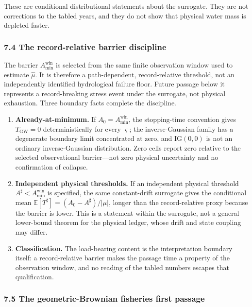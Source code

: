\documentclass[11pt]{article}
\providecommand{\tightlist}{\setlength{\itemsep}{0pt}\setlength{\parskip}{0pt}}
\begin{document}
These are conditional distributional statements about the surrogate.
They are not corrections to the tabled years, and they do not show that
physical water mass is depleted faster.

\subsubsection{7.4 The record-relative barrier
discipline}\label{the-record-relative-barrier-discipline}

The barrier \(A_{\min}^{\mathrm{win}}\) is selected from the same finite observation window used to estimate \(\widehat\mu\). It is therefore a path-dependent, record-relative threshold, not an independently identified hydrological failure floor. Future passage below it represents a record-breaking stress event under the surrogate, not physical exhaustion. Three boundary facts complete the discipline.

\begin{enumerate}
\def\labelenumi{\arabic{enumi}.}
\tightlist
\item
  \textbf{Already-at-minimum.} If \(A_0 = A_{\min}^{\mathrm{win}}\), the
  stopping-time convention gives \(T_{\mathrm{GW}} = 0\)
  deterministically for every \(\varsigma\); the inverse-Gaussian family
  has a degenerate boundary limit concentrated at zero, and
  \(\mathrm{IG}(0,0)\) is not an ordinary inverse-Gaussian distribution.
  Zero cells report zero relative to the selected observational barrier---not zero physical uncertainty and no confirmation of collapse.
\item
  \textbf{Independent physical thresholds.} If an independent physical
  threshold \(A^\sharp < A_{\min}^{\mathrm{win}}\) is specified, the
  same constant-drift surrogate gives the conditional mean
  \(\mathbb{E}[T^\sharp] = (A_0 - A^\sharp)/|\mu|\), longer than the
  record-relative proxy because the barrier is lower. This is a
  statement within the surrogate, not a general lower-bound theorem for
  the physical ledger, whose drift and state coupling may differ.
\item
  \textbf{Classification.} The load-bearing content is the
  interpretation boundary itself: a record-relative barrier makes the
  passage time a property of the observation window, and no reading of
  the tabled numbers escapes that qualification.
\end{enumerate}

\subsubsection{7.5 The geometric-Brownian fisheries first
passage}\label{the-geometric-brownian-fisheries-first-passage}
\end{document}

